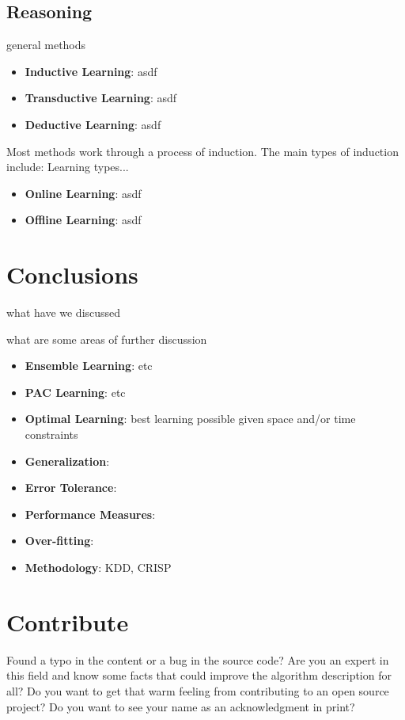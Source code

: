 \documentclass[a4paper, 11pt]{article}
\begin{document}
\subsection{Reasoning}
\label{subsec:reasoning}

general methods

\begin{itemize}
	\item \textbf{Inductive Learning}: asdf
	\item \textbf{Transductive Learning}: asdf
	\item \textbf{Deductive Learning}: asdf
\end{itemize}


Most methods work through a process of induction. The main types of induction include:
Learning types...

\begin{itemize}
	\item \textbf{Online Learning}: asdf
	\item \textbf{Offline Learning}: asdf
\end{itemize}




\section{Conclusions}
\label{sec:conclusions}
what have we discussed


what are some areas of further discussion

\begin{itemize}
	\item \textbf{Ensemble Learning}: etc
	\item \textbf{PAC Learning}: etc
	\item \textbf{Optimal Learning}: best learning possible given space and/or time constraints
	\item \textbf{Generalization}:
	\item \textbf{Error Tolerance}:
	\item \textbf{Performance Measures}:
	\item \textbf{Over-fitting}:
	\item \textbf{Methodology}: KDD, CRISP
\end{itemize}



% 
% 
\section{Contribute}
\label{sec:contribute}
Found a typo in the content or a bug in the source code? 
Are you an expert in this field and know some facts that could improve the algorithm description for all?
Do you want to get that warm feeling from contributing to an open source project? 
Do you want to see your name as an acknowledgment in print?
\end{document}
